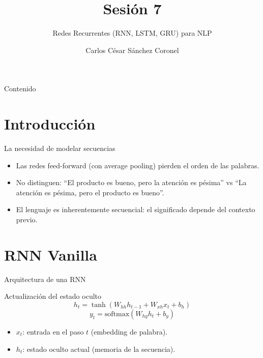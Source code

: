 \documentclass[aspectratio=169, 10pt, xcolor=table]{beamer}
\title[SESIÓN 7 NLP]{\textbf{Sesión 7}}
\subtitle{Redes Recurrentes (RNN, LSTM, GRU) para NLP}
\author[Prof. C. Sánchez]{Carlos César Sánchez Coronel}
\institute{\textbf{NLP}}
\date{}
\begin{document}
\begin{frame}
    \titlepage
\end{frame}

\begin{frame}{Contenido}
    \tableofcontents
\end{frame}

\section{Introducción}

\begin{frame}{La necesidad de modelar secuencias}
    \begin{itemize}
        \item Las redes feed-forward (con average pooling) pierden el orden de las palabras.
        \item No distinguen: ``El producto es bueno, pero la atención es pésima'' vs ``La atención es pésima, pero el producto es bueno''.
        \item El lenguaje es inherentemente secuencial: el significado depende del contexto previo.
    \end{itemize}
\end{frame}

\section{RNN Vanilla}

\begin{frame}{Arquitectura de una RNN}
    \begin{block}{Actualización del estado oculto}
        \[
        h_t = \tanh(W_{hh} h_{t-1} + W_{xh} x_t + b_h)
        \]
        \[
        y_t = \text{softmax}(W_{hy} h_t + b_y)
        \]
        \begin{itemize}
            \item $x_t$: entrada en el paso $t$ (embedding de palabra).
            \item $h_t$: estado oculto actual (memoria de la secuencia).
        \end{itemize}
    \end{block}
\end{frame}
\end{document}
